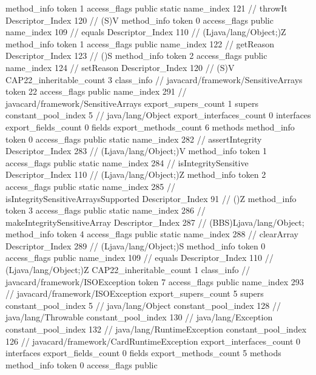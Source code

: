 {{{{{				}
				method_info {
					token	1
					access_flags	public static
					name_index	121		// throwIt
					Descriptor_Index	120		// (S)V
				}
				method_info {
					token	0
					access_flags	public
					name_index	109		// equals
					Descriptor_Index	110		// (Ljava/lang/Object;)Z
				}
				method_info {
					token	1
					access_flags	public
					name_index	122		// getReason
					Descriptor_Index	123		// ()S
				}
				method_info {
					token	2
					access_flags	public
					name_index	124		// setReason
					Descriptor_Index	120		// (S)V
				}
			}
			CAP22_inheritable_count	3
		}
		class_info {		// javacard/framework/SensitiveArrays
			token	22
			access_flags	public
			name_index	291		// javacard/framework/SensitiveArrays
			export_supers_count	1
			supers {
				constant_pool_index	5		// java/lang/Object
			}
			export_interfaces_count	0
			interfaces {
			}
			export_fields_count	0
			fields {
			}
			export_methods_count	6
			methods {
				method_info {
					token	0
					access_flags	public static
					name_index	282		// assertIntegrity
					Descriptor_Index	283		// (Ljava/lang/Object;)V
				}
				method_info {
					token	1
					access_flags	public static
					name_index	284		// isIntegritySensitive
					Descriptor_Index	110		// (Ljava/lang/Object;)Z
				}
				method_info {
					token	2
					access_flags	public static
					name_index	285		// isIntegritySensitiveArraysSupported
					Descriptor_Index	91		// ()Z
				}
				method_info {
					token	3
					access_flags	public static
					name_index	286		// makeIntegritySensitiveArray
					Descriptor_Index	287		// (BBS)Ljava/lang/Object;
				}
				method_info {
					token	4
					access_flags	public static
					name_index	288		// clearArray
					Descriptor_Index	289		// (Ljava/lang/Object;)S
				}
				method_info {
					token	0
					access_flags	public
					name_index	109		// equals
					Descriptor_Index	110		// (Ljava/lang/Object;)Z
				}
			}
			CAP22_inheritable_count	1
		}
		class_info {		// javacard/framework/ISOException
			token	7
			access_flags	public
			name_index	293		// javacard/framework/ISOException
			export_supers_count	5
			supers {
				constant_pool_index	5		// java/lang/Object
				constant_pool_index	128		// java/lang/Throwable
				constant_pool_index	130		// java/lang/Exception
				constant_pool_index	132		// java/lang/RuntimeException
				constant_pool_index	126		// javacard/framework/CardRuntimeException
			}
			export_interfaces_count	0
			interfaces {
			}
			export_fields_count	0
			fields {
			}
			export_methods_count	5
			methods {
				method_info {
					token	0
					access_flags	public
}}}}}
